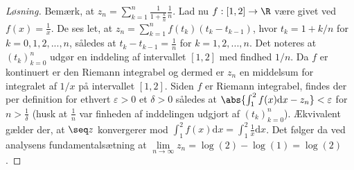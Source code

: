 \begin{opg}
\begin{enumerate}
		
		\begin{proof}[Løsning]
			Bemærk, at $ z_n=\sum_{k=1}^{n}\frac{1}{1+\frac{k}{n}}\frac{1}{n} $. Lad nu $ f: [1,2]\to \R $ være givet ved $ f(x)=\frac{1}{x} $. De ses let, at $ z_n=\sum_{k=1}^{n}f(t_k)(t_k-t_{k-1}) $, hvor $t_k=1+k/n $ for $ k=0,1,2,...,n $, således at $ t_k-t_{k-1}=\frac{1}{n} $ for $ k=1,2,...,n $. Det noteres at $ (t_k)_{k=0}^{n} $ udgør en inddeling af intervallet $ [1,2] $ med findhed $ 1/n $. Da $ f $ er kontinuert er den Riemann integrabel og dermed er $ z_n $ en middelsum for integralet af $ 1/x $ på intervallet $ [1,2] $. Siden $ f $ er Riemann integrabel, findes der per definition for ethvert $ \varepsilon>0 $ et $ \delta>0 $ således at $ \abs{\int_{1}^{2}f(x)\text{d} x-z_n}<\varepsilon $ for $ n>\frac{1}{\delta} $ (husk at $ \frac{1}{n} $ var finheden af inddelingen udgjort af $ (t_k)_{k=0}^{n} $). Ækvivalent gælder der, at $ \seq z $ konvergerer mod $ \int_{1}^{2} f(x)\text{d} x=\int_{1}^{2} \frac{1}{x}\text{d} x $. Det følger da ved analysens fundamentalsætning at $ \lim\limits_{n\to\infty}z_n=\log(2)-\log(1)=\log(2) $.
		\end{proof}
	\end{enumerate}
\end{opg}
